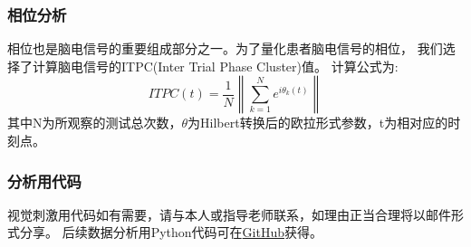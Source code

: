 \subsubsection{相位分析}
相位也是脑电信号的重要组成部分之一。为了量化患者脑电信号的相位，
我们选择了计算脑电信号的ITPC(Inter Trial Phase Cluster)值\cite{gu2010phase}。
计算公式为:
\begin{equation}
    ITPC(t) = \frac{1}{N} \left\| \sum_{k=1}^N e^{i \theta_k(t)} \right\|
\end{equation}
其中N为所观察的测试总次数，$\theta$为Hilbert转换后的欧拉形式参数，t为相对应的时刻点。


\subsubsection{分析用代码}
视觉刺激用代码如有需要，请与本人或指导老师联系，如理由正当合理将以邮件形式分享。
后续数据分析用Python代码可在\href{https://github.com/ZhangJiayiLab/EEGAnalysis}{GitHub}获得。
